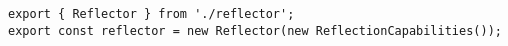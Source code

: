 \begin{verbatim}
export { Reflector } from './reflector';
export const reflector = new Reflector(new ReflectionCapabilities());
\end{verbatim}
